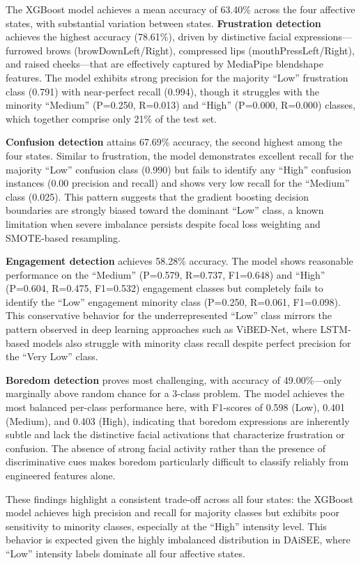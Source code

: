 The XGBoost model achieves a mean accuracy of 63.40\% across the four affective states, with substantial variation between states. \textbf{Frustration detection} achieves the highest accuracy (78.61\%), driven by distinctive facial expressions---furrowed brows (browDownLeft/Right), compressed lips (mouthPressLeft/Right), and raised cheeks---that are effectively captured by MediaPipe blendshape features. The model exhibits strong precision for the majority ``Low'' frustration class (0.791) with near-perfect recall (0.994), though it struggles with the minority ``Medium'' (P=0.250, R=0.013) and ``High'' (P=0.000, R=0.000) classes, which together comprise only 21\% of the test set.

\textbf{Confusion detection} attains 67.69\% accuracy, the second highest among the four states. Similar to frustration, the model demonstrates excellent recall for the majority ``Low'' confusion class (0.990) but fails to identify any ``High'' confusion instances (0.00 precision and recall) and shows very low recall for the ``Medium'' class (0.025). This pattern suggests that the gradient boosting decision boundaries are strongly biased toward the dominant ``Low'' class, a known limitation when severe imbalance persists despite focal loss weighting and SMOTE-based resampling.

\textbf{Engagement detection} achieves 58.28\% accuracy. The model shows reasonable performance on the ``Medium'' (P=0.579, R=0.737, F1=0.648) and ``High'' (P=0.604, R=0.475, F1=0.532) engagement classes but completely fails to identify the ``Low'' engagement minority class (P=0.250, R=0.061, F1=0.098). This conservative behavior for the underrepresented ``Low'' class mirrors the pattern observed in deep learning approaches such as ViBED-Net, where LSTM-based models also struggle with minority class recall despite perfect precision for the ``Very Low'' class.

\textbf{Boredom detection} proves most challenging, with accuracy of 49.00\%---only marginally above random chance for a 3-class problem. The model achieves the most balanced per-class performance here, with F1-scores of 0.598 (Low), 0.401 (Medium), and 0.403 (High), indicating that boredom expressions are inherently subtle and lack the distinctive facial activations that characterize frustration or confusion. The absence of strong facial activity rather than the presence of discriminative cues makes boredom particularly difficult to classify reliably from engineered features alone.

These findings highlight a consistent trade-off across all four states: the XGBoost model achieves high precision and recall for majority classes but exhibits poor sensitivity to minority classes, especially at the ``High'' intensity level. This behavior is expected given the highly imbalanced distribution in DAiSEE, where ``Low'' intensity labels dominate all four affective states.

